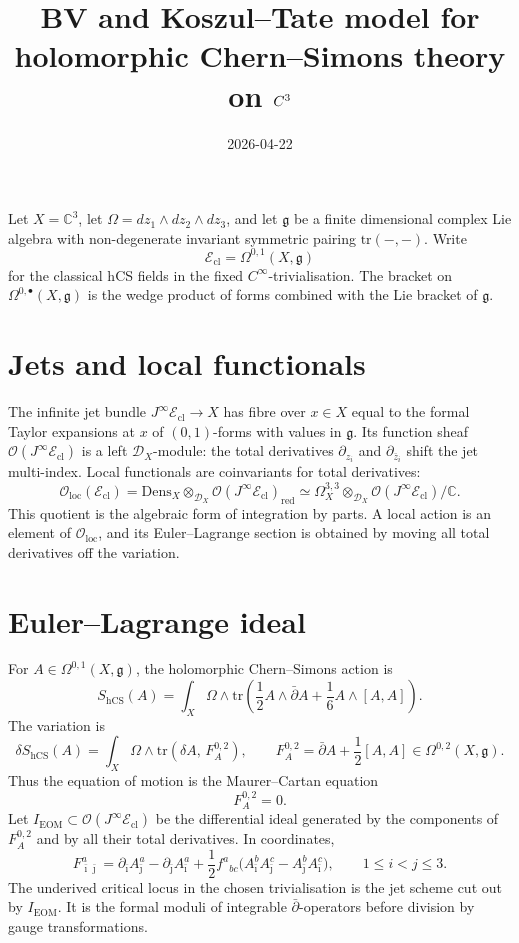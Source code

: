 \documentclass[11pt]{amsart}
\title{BV and Koszul--Tate model for holomorphic Chern--Simons theory on
\texorpdfstring{$\C^3$}{C3}}
\date{2026-04-22}
\providecommand{\C}{\mathbb{C}}
\providecommand{\cD}{\mathcal{D}}
\providecommand{\cE}{\mathcal{E}}
\providecommand{\cO}{\mathcal{O}}
\providecommand{\EOM}{\mathrm{EOM}}
\providecommand{\Dens}{\mathrm{Dens}}
\providecommand{\dbar}{\bar{\partial}}
\providecommand{\g}{\mathfrak{g}}
\providecommand{\hCS}{\mathrm{hCS}}
\providecommand{\tr}{\mathrm{tr}}
\providecommand{\Jinf}{J^{\infty}}
\theoremstyle{plain}
\theoremstyle{definition}
\begin{document}
\maketitle

Let \(X=\C^3\), let
\(\Omega=dz_1\wedge dz_2\wedge dz_3\), and let \(\g\) be a finite
dimensional complex Lie algebra with non-degenerate invariant symmetric
pairing \(\tr(-,-)\). Write
\[
  \cE_{\mathrm{cl}}=\Omega^{0,1}(X,\g)
\]
for the classical hCS fields in the fixed \(C^\infty\)-trivialisation.
The bracket on \(\Omega^{0,\bullet}(X,\g)\) is the wedge product of
forms combined with the Lie bracket of \(\g\).

\section{Jets and local functionals}

The infinite jet bundle \(\Jinf\cE_{\mathrm{cl}}\to X\) has fibre over
\(x\in X\) equal to the formal Taylor expansions at \(x\) of
\((0,1)\)-forms with values in \(\g\). Its function sheaf
\(\cO(\Jinf\cE_{\mathrm{cl}})\) is a left \(\cD_X\)-module: the total
derivatives \(\partial_{z_i}\) and \(\partial_{\bar z_i}\) shift the jet
multi-index. Local functionals are coinvariants for total derivatives:
\[
  \cO_{\mathrm{loc}}(\cE_{\mathrm{cl}})
  =
  \Dens_X\otimes_{\cD_X}\cO(\Jinf\cE_{\mathrm{cl}})_{\mathrm{red}}
  \simeq
  \Omega_X^{3,3}\otimes_{\cD_X}\cO(\Jinf\cE_{\mathrm{cl}})/\C .
\]
This quotient is the algebraic form of integration by parts. A local
action is an element of \(\cO_{\mathrm{loc}}\), and its Euler--Lagrange
section is obtained by moving all total derivatives off the variation.

\section{Euler--Lagrange ideal}

For \(A\in\Omega^{0,1}(X,\g)\), the holomorphic Chern--Simons action is
\[
  S_{\hCS}(A)=
  \int_X\Omega\wedge
  \tr\!\left(\frac12 A\wedge\dbar A+\frac16 A\wedge[A,A]\right).
\]
The variation is
\[
  \delta S_{\hCS}(A)=
  \int_X\Omega\wedge
  \tr\!\left(\delta A,\,
    F_A^{0,2}\right),
  \qquad
  F_A^{0,2}=\dbar A+\frac12[A,A]\in\Omega^{0,2}(X,\g).
\]
Thus the equation of motion is the Maurer--Cartan equation
\[
  F_A^{0,2}=0 .
\]
Let \(I_{\EOM}\subset\cO(\Jinf\cE_{\mathrm{cl}})\) be the differential
ideal generated by the components of \(F_A^{0,2}\) and by all their
total derivatives. In coordinates,
\[
  F^a_{\bar\imath\bar\jmath}
  =
  \partial_{\bar\imath}A^a_{\bar\jmath}
  -\partial_{\bar\jmath}A^a_{\bar\imath}
  +\frac12 f^a{}_{bc}
    \bigl(A^b_{\bar\imath}A^c_{\bar\jmath}
          -A^b_{\bar\jmath}A^c_{\bar\imath}\bigr),
  \qquad 1\leq i<j\leq3 .
\]
The underived critical locus in the chosen trivialisation is the jet
scheme cut out by \(I_{\EOM}\). It is the formal moduli of integrable
\(\dbar\)-operators before division by gauge transformations.
\end{document}
